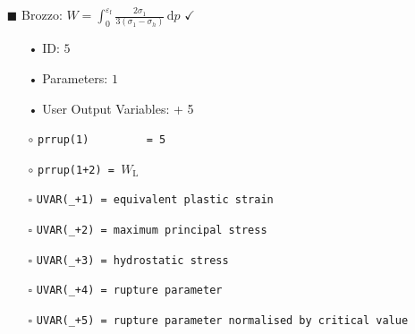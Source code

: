 \documentclass[11pt,a4paper,twoside,final,onecolumn,titlepage]{article}
\newcommand{\verified}{\hspace{0.5pt} {\LARGE $\checkmark$}}
\begin{document}
\begin{itemize}
	\item[\tiny$\blacksquare$] Brozzo: $\displaystyle W =  \int_{0}^{\varepsilon_\textrm{f}}\frac{2\sigma_{1}}{3\left(\sigma_{1}-\sigma_{h}\right)}\,\text{d}p$ \verified{}
	\begin{itemize}
		\item[•] ID: $5$
		\item[•] Parameters: $1$
		\item[•] User Output Variables: + 5\\
		\item[$\circ$] \texttt{prrup(1)\,\,\,\,\,\,\,\,\,= 5}
		\item[$\circ$] \texttt{prrup(1+2) = $W_\textrm{L}$}\\
		\item[\tiny$\square$] \texttt{UVAR(\_+1) = equivalent plastic strain}
		\item[\tiny$\square$] \texttt{UVAR(\_+2) = maximum principal stress} 
		\item[\tiny$\square$] \texttt{UVAR(\_+3) = hydrostatic stress}
		\item[\tiny$\square$] \texttt{UVAR(\_+4) = rupture parameter}
		\item[\tiny$\square$] \texttt{UVAR(\_+5) = rupture parameter normalised by critical value}\\
	\end{itemize}
\end{itemize}
\end{document}
